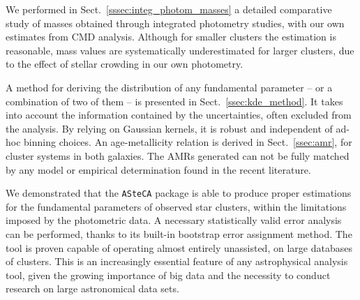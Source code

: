 \documentclass{aa}
\begin{document}
We performed in Sect.~\ref{sssec:integ_photom_masses} a detailed comparative
study of masses obtained through integrated photometry studies, with our own
estimates from CMD analysis.
Although for smaller clusters the estimation is reasonable, mass values
are systematically underestimated for larger
clusters, due to the effect of stellar crowding in our own photometry.

A method for deriving the distribution of any fundamental parameter -- or a
combination of two of them -- is presented in Sect.~\ref{ssec:kde_method}. It
takes into account the information contained by the uncertainties, often
excluded from the analysis. By relying on Gaussian kernels, it is robust and
independent of ad-hoc binning choices.
%
An age-metallicity relation is derived in Sect.~\ref{ssec:amr}, for
cluster systems in both galaxies. The AMRs generated can not be fully matched by
any model or empirical determination found in the recent literature.

We demonstrated that the \texttt{ASteCA} package is able to produce proper
estimations for the fundamental parameters of observed star clusters,
within the limitations imposed by the photometric data.
A necessary statistically valid error analysis
can be performed, thanks to its built-in bootstrap error assignment method.
%
The tool is proven capable of operating almost entirely unassisted, on large
databases of clusters. This is an increasingly essential feature
of any astrophysical analysis tool, given the growing importance of big data and
the necessity to conduct research on large astronomical data sets.




\end{document}
